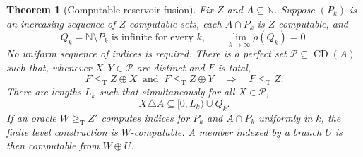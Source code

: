 \documentclass[11pt,a4paper]{article}
\newcommand{\N}{\mathbb N}
\newcommand{\leT}{\leq_{\mathrm T}}
\newcommand{\geT}{\geq_{\mathrm T}}
\newcommand{\CD}{\operatorname{CD}}
\newcommand{\udens}{\overline\rho}
\newtheorem{theorem}{Theorem}[section]
\theoremstyle{definition}
\theoremstyle{remark}
\begin{document}
\begin{theorem}[Computable-reservoir fusion]\label{thm:fusion}
Fix $Z$ and $A\subseteq\N$. Suppose $(P_k)$ is an increasing sequence of
$Z$-computable sets, each $A\cap P_k$ is $Z$-computable, and
\[
 Q_k=\N\setminus P_k\text{ is infinite for every }k,
 \qquad \lim_{k\to\infty}\udens(Q_k)=0.
\]
No uniform sequence of indices is required. There is a perfect set
$\mathcal P\subseteq\CD(A)$ such that, whenever $X,Y\in\mathcal P$ are
distinct and $F$ is total,
\begin{equation}\label{eq:relativepair}
 F\leT Z\oplus X\ \text{ and }\ F\leT Z\oplus Y
       \quad\Longrightarrow\quad F\leT Z.
\end{equation}
There are lengths $L_k$ such that simultaneously for all $X\in\mathcal P$,
\begin{equation}\label{eq:uniformerror}
 X\triangle A\subseteq[0,L_k)\cup Q_k.
\end{equation}
If an oracle $W\geT Z'$ computes indices for $P_k$ and $A\cap P_k$
uniformly in $k$, the finite level construction is $W$-computable.
A member indexed by a branch $U$ is then computable from $W\oplus U$.
\end{theorem}
\end{document}

